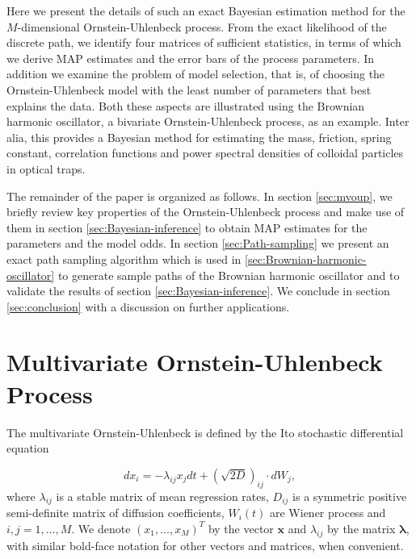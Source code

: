 \documentclass[english,aps, twocolumn, pre,superscriptaddress, notitlepage]{revtex4-1}
\begin{document}
Here we present the details of such an exact Bayesian estimation method
for the $M$-dimensional Ornstein-Uhlenbeck process. From the exact
likelihood of the discrete path, we identify four matrices of sufficient
statistics, in terms of which we derive MAP estimates and the error
bars of the process parameters. In addition we examine the problem
of model selection, that is, of choosing the Ornstein-Uhlenbeck model
with the least number of parameters that best explains the data. Both
these aspects are illustrated using the Brownian harmonic oscillator,
a bivariate Ornstein-Uhlenbeck process, as an example. Inter alia,
this provides a Bayesian method for estimating the mass, friction,
spring constant, correlation functions and power spectral densities
of colloidal particles in optical traps. 

The remainder of the paper is organized as follows. In section \ref{sec:mvoup},
we briefly review key properties of the Ornstein-Uhlenbeck process
and make use of them in section \ref{sec:Bayesian-inference} to obtain
MAP estimates for the parameters and the model odds. In section \ref{sec:Path-sampling}
we present an exact path sampling algorithm which is used in \ref{sec:Brownian-harmonic-oscillator}
to generate sample paths of the Brownian harmonic oscillator and to
validate the results of section \ref{sec:Bayesian-inference}. We
conclude in section \ref{sec:conclusion} with a discussion on further
applications. 

\section{Multivariate Ornstein-Uhlenbeck Process\label{sec:mvoup}}

The multivariate Ornstein-Uhlenbeck is defined by the Ito stochastic
differential equation \cite{gardiner1985handbook}

\begin{equation}
dx_{i}=-\lambda_{ij}x_{j}dt+(\sqrt{2D})_{ij}\cdot dW_{j},\label{eq:mvou}
\end{equation}
where $\lambda_{ij}$ is a stable matrix of mean regression rates,
$D_{ij}$ is a symmetric positive semi-definite matrix of diffusion
coefficients, $W_{i}(t)$ are Wiener process and $i,j=1,\ldots,M$.
We denote $(x_{1},\ldots,x_{M})^{T}$ by the vector $\boldsymbol{x}$
and $\lambda_{ij}$ by the matrix $\boldsymbol{\lambda}$, with similar
bold-face notation for other vectors and matrices, when convenient. 
\end{document}
